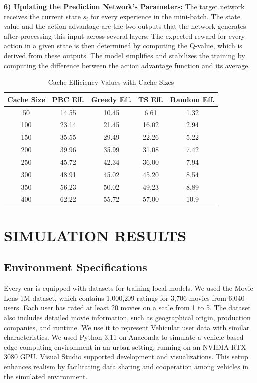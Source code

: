 \documentclass[journal]{IEEEtran}
\begin{document}
\textbf{6) Updating the Prediction Network's Parameters:} The target network receives the current state $s_i$ for every experience in the mini-batch. The state value and the action advantage are the two outputs that the network generates after processing this input across several layers. The expected reward for every action in a given state is then determined by computing the Q-value, which is derived from these outputs. The model simplifies and stabilizes the training by computing the difference between the action advantage function and its average.
\begin{table}[t]
\caption{Cache Efficiency Values with Cache Sizes}
\label{table:cache_efficiency}
\centering
\begin{tabular}{|c|c|c|c|c|}
\hline
\textbf{Cache Size} & \textbf{PBC Eff.} & \textbf{Greedy Eff.} & \textbf{TS Eff.} & \textbf{Random Eff.} \\ \hline

50  & 14.55 & 10.45 & 6.61 & 1.32 \\ \hline
100 & 23.14 & 21.45 & 16.02 & 2.94 \\ \hline
150 & 35.55 & 29.49 & 22.26 & 5.22 \\ \hline
200 & 39.96 & 35.99 & 31.08 & 7.42 \\ \hline
250 & 45.72 & 42.34 & 36.00 & 7.94 \\ \hline
300 & 48.91 & 45.02 & 45.20 & 8.54 \\ \hline
350 & 56.23 & 50.02 & 49.23 & 8.89 \\ \hline
400 & 62.22 & 55.72 & 57.00 & 10.9\\ \hline
\end{tabular}
\end{table}
\section{SIMULATION RESULTS}
\subsection{ Environment Specifications}
Every car is equipped with datasets for training local models. We used the Movie Lens 1M dataset, which contains 1,000,209 ratings for 3,706 movies from 6,040 users. Each user has rated at least 20 movies on a scale from 1 to 5. The dataset also includes detailed movie information, such as geographical origin, production companies, and runtime. We use it to represent Vehicular user data with similar characteristics. We used Python 3.11 on Anaconda to simulate a vehicle-based edge computing environment in an urban setting, running on an NVIDIA RTX 3080 GPU. Visual Studio supported development and visualizations. This setup enhances realism by facilitating data sharing and cooperation among vehicles in the simulated environment.
\end{document}
